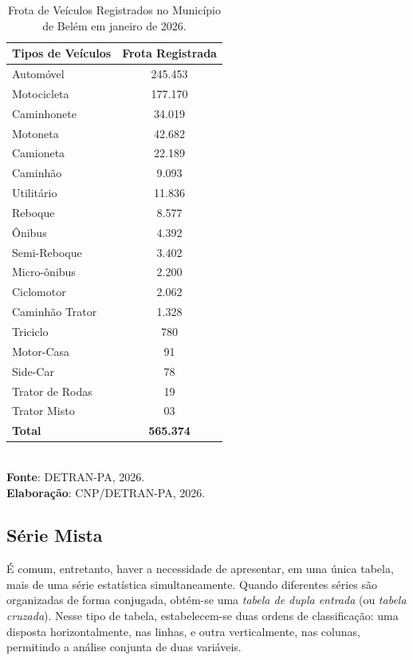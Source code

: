 \begin{table}[H]
    \centering
    {
    \caption{Frota de Veículos Registrados no Município de Belém em janeiro de 2026.}
    \label{obitos2}
    \vspace{0.1cm}
\begin{tabular}{l|c}
\hline\hline
\textbf{Tipos de Veículos}   & \textbf{Frota Registrada} \\
\hline\hline
Automóvel       &  245.453   \\
Motocicleta     &  177.170 \\
Caminhonete     &  34.019  \\
Motoneta        &  42.682  \\
Camioneta       &  22.189  \\
Caminhão        &  9.093   \\
Utilitário      &  11.836   \\
Reboque         &  8.577   \\ 
Ônibus          &  4.392   \\
Semi-Reboque    &  3.402   \\
Micro-ônibus    &  2.200   \\
Ciclomotor      &  2.062   \\
Caminhão Trator &  1.328   \\
Triciclo        &  780     \\
Motor-Casa      &  91      \\
Side-Car        &  78      \\
Trator de Rodas &  19      \\
Trator Misto    &  03     \\
\hline\hline
\textbf{Total}  & \textbf{565.374}   \\
\hline\hline
\end{tabular}}
\\
\hspace{-2.6cm} 
\textbf{Fonte}: DETRAN-PA, 2026. \\ 
\hspace{-1.0cm}
\textbf{Elaboração}: CNP/DETRAN-PA, 2026.
\end{table}

\newpage
\subsection{Série Mista}

É comum, entretanto, haver a necessidade de apresentar, em uma única tabela, mais de uma série estatística simultaneamente. Quando diferentes séries são organizadas de forma conjugada, obtém-se uma \textit{tabela de dupla entrada} (ou \textit{tabela cruzada}). Nesse tipo de tabela, estabelecem-se duas ordens de classificação: uma disposta horizontalmente, nas linhas, e outra verticalmente, nas colunas, permitindo a análise conjunta de duas variáveis.

